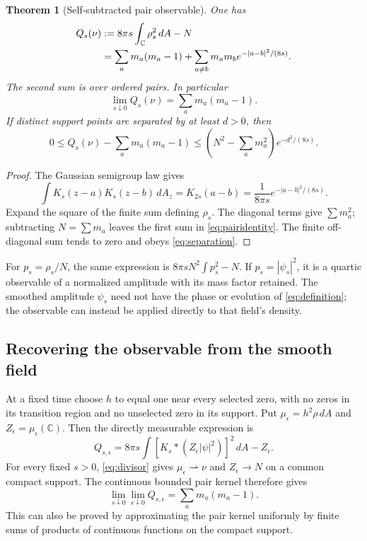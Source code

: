 \documentclass[11pt]{article}
\newcommand{\C}{\mathbb C}
\newcommand{\dd}{\,d}
\newcommand{\eps}{\epsilon}
\newtheorem{theorem}{Theorem}[section]
\theoremstyle{definition}
\theoremstyle{remark}
\begin{document}
\begin{theorem}[Self-subtracted pair observable]
\label{thm:pairs}
One has
\begin{align}
 Q_s(\nu)&:=8\pi s\int_\C\rho_s^2\dd A-N\notag\\
 &=\sum_a m_a(m_a-1)
   +\sum_{a\ne b}m_am_b e^{-|a-b|^2/(8s)}.
 \label{eq:pairidentity}
\end{align}
The second sum is over ordered pairs. In particular
\begin{equation}
 \lim_{s\downarrow0}Q_s(\nu)=\sum_a m_a(m_a-1).
 \label{eq:excess}
\end{equation}
If distinct support points are separated by at least $d>0$, then
\begin{equation}
 0\le Q_s(\nu)-\sum_a m_a(m_a-1)
 \le\left(N^2-\sum_a m_a^2\right)e^{-d^2/(8s)}.
 \label{eq:separation}
\end{equation}
\end{theorem}
\begin{proof}
The Gaussian semigroup law gives
\[
 \int K_s(z-a)K_s(z-b)\dd A_z
 =K_{2s}(a-b)=\frac1{8\pi s}e^{-|a-b|^2/(8s)}.
\]
Expand the square of the finite sum defining $\rho_s$. The diagonal
terms give $\sum m_a^2$; subtracting $N=\sum m_a$ leaves the first
sum in \eqref{eq:pairidentity}. The finite off-diagonal sum tends to
zero and obeys \eqref{eq:separation}.
\end{proof}

For $p_s=\rho_s/N$, the same expression is
$8\pi sN^2\int p_s^2-N$. If $p_s=|\psi_s|^2$, it is a quartic
observable of a normalized amplitude with its mass factor retained.
The smoothed amplitude $\psi_s$ need not have the phase or evolution
of \eqref{eq:definition}; the observable can instead be applied directly
to that field's density.

\subsection{Recovering the observable from the smooth field}

At a fixed time choose $h$ to equal one near every selected zero, with
no zeros in its transition region and no unselected zero in its support.
Put $\mu_\eps=h^2\rho\dd A$ and $Z_\eps=\mu_\eps(\C)$.
Then the directly measurable expression is
\begin{equation}
 Q_{s,\eps}=8\pi s\int
 \left[K_s*(Z_\eps|\psi|^2)\right]^2\dd A-Z_\eps.
 \label{eq:fieldobservable}
\end{equation}
For every fixed $s>0$, \eqref{eq:divisor} gives
$\mu_\eps\rightharpoonup\nu$ and $Z_\eps\to N$ on a common compact
support. The continuous bounded pair kernel therefore gives
\begin{equation}
 \lim_{s\downarrow0}\lim_{\eps\downarrow0}Q_{s,\eps}
 =\sum_a m_a(m_a-1). \label{eq:orderedlimit}
\end{equation}
This can also be proved by approximating the pair kernel uniformly by
finite sums of products of continuous functions on the compact support.
\end{document}
